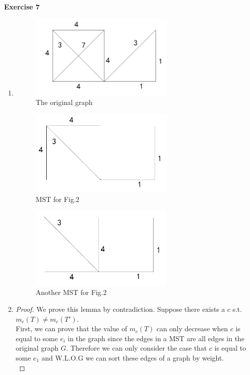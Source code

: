 \documentclass[12pt, notitlepage]{article}
\begin{document}
\vspace{1cm}
\textbf{Exercise 7}
\begin{enumerate}[1.]
\item \mbox{\quad}
\begin{figure}[H]\centering
\includegraphics[width=7cm]{7-1.png}\caption{The original graph}
\end{figure}
\begin{figure}[H]\centering
	\includegraphics[width=7cm]{7-2.png}\caption{MST for Fig.2}
\end{figure}
\begin{figure}[H]\centering
	\includegraphics[width=7cm]{7-3.png}\caption{Another MST for Fig.2}
\end{figure}
\item
\begin{proof}
We prove this lemma by contradiction. Suppose there exists a $c$ s.t. $m_c(T) \neq m_c(T')$.\\
First, we can prove that the value of $m_c(T)$ can only decrease when $c$ is equal to some $e_i$ in the graph since the edges in a MST are all edges in the original graph $G$. Therefore we can only consider the case that $c$ is equal to some $e_1$ and W.L.O.G we can sort these edges of a graph by weight.\\

\end{proof}
\end{enumerate}
\end{document}
